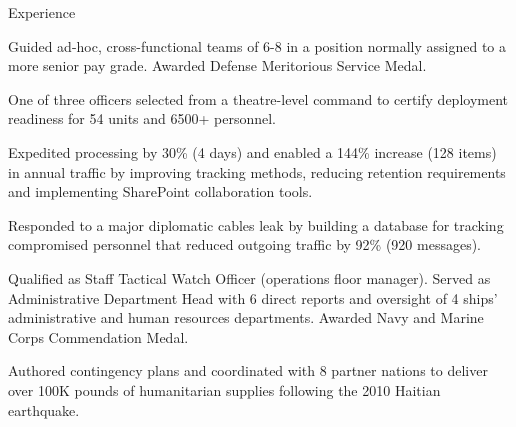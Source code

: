 \begin{rubric}{Experience}
\begin{list2}
	\item Guided ad-hoc, cross-functional teams of 6-8 in a position normally assigned to a more senior pay grade. Awarded Defense Meritorious Service Medal.
	\item One of three officers selected from a theatre-level command to certify deployment readiness for 54 units and 6500+ personnel.
	\item Expedited processing by 30\% (4 days) and enabled a 144\% increase (128 items) in annual traffic by improving tracking methods, reducing retention requirements and implementing SharePoint collaboration tools.
	\item Responded to a major diplomatic cables leak by building a database for tracking compromised personnel that reduced outgoing traffic by 92\% (920 messages).
\end{list2}
\entry*[08/2009 \-- 08/2011] 
\begin{list2}
	\item Qualified as Staff Tactical Watch Officer (operations floor manager). Served as Administrative Department Head with 6 direct reports and oversight of 4 ships' administrative and human resources departments. Awarded Navy and Marine Corps Commendation Medal.
	\item Authored contingency plans and coordinated with 8 partner nations to deliver over 100K pounds of humanitarian supplies following the 2010 Haitian earthquake.

\end{list2}
\end{rubric}
